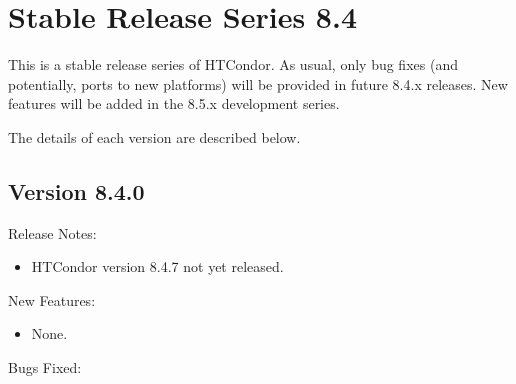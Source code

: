 
\section{\label{sec:History-8-4}Stable Release Series 8.4}

This is a stable release series of HTCondor.
As usual, only bug fixes (and potentially, ports to new platforms)
will be provided in future 8.4.x releases.
New features will be added in the 8.5.x development series.

The details of each version are described below.

\subsection*{\label{sec:New-8-4-0}Version 8.4.0}

\noindent Release Notes:

\begin{itemize}

\item HTCondor version 8.4.7 not yet released.

\end{itemize}


\noindent New Features:

\begin{itemize}

\item None.

\end{itemize}

\noindent Bugs Fixed:

